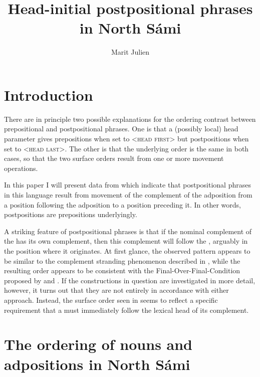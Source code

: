 \documentclass[output=paper]{LSP/langsci}
\author{
Marit Julien	\affiliation{Lund University}
}
\title{Head-initial postpositional phrases in North Sámi}
\begin{document}
\section{Introduction} %

There are in principle two possible explanations for the ordering contrast between prepositional and postpositional phrases. One is that a (possibly local) head parameter gives prepositions when set to <\textsc{head first}> but postpositions when set to <\textsc{head last}>. The other is that the underlying order is the same in both cases, so that the two surface orders result from one or more movement operations.

In this paper I will present data from  which indicate that postpositional phrases in this language result from movement of the complement of the adposition from a position following the adposition to a position preceding it. In other words,  postpositions are prepositions underlyingly.

A striking feature of  postpositional phrases is that if the nominal complement of the  has its own complement, then this complement will follow the , arguably in the position where it originates. At first glance, the observed pattern appears to be similar to the complement stranding phenomenon described in \citet{Sheehan2009}, while the resulting order appears to be consistent with the Final-Over-Final-Condition proposed by \citet{Holmberg2000deriving} and \citet{BiberauerEtAl2008,BiberauerEtAl2014syntactic}. If the constructions in {question} are investigated in more detail, however, it turns out that they are not entirely in accordance with either approach. Instead, the surface order seen in  seems to reflect a specific requirement that a  must immediately follow the lexical head of its complement.


\section{The ordering of nouns and adpositions in North Sámi} %
\end{document}
